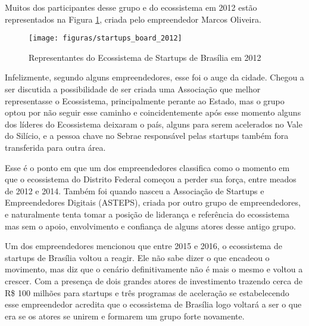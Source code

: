 Muitos dos participantes desse grupo e do ecossistema em 2012 estão representados na Figura \ref{figure:startups_board_2012}, criada pelo empreendedor Marcos Oliveira.

\begin{figure}[!htb]
	\centering
	\texttt{[image: figuras/startups\_board\_2012]}
	\caption{Representantes do Ecossistema de Startups de Brasília em 2012}
	\label{figure:startups_board_2012}
\end{figure}

Infelizmente, segundo alguns empreendedores, esse foi o auge da cidade. Chegou a ser discutida a possibilidade de ser criada uma Associação que melhor representasse o Ecossistema, principalmente perante ao Estado, mas o grupo optou por não seguir esse caminho e coincidentemente após esse momento alguns dos líderes do Ecossistema deixaram o país, alguns para serem acelerados no Vale do Silício, e a pessoa chave no Sebrae responsável pelas startups também fora transferida para outra área. 

Esse é o ponto em que um dos empreendedores classifica como o momento em que o ecossistema do Distrito Federal começou a perder sua força, entre meados de 2012 e 2014. Também foi quando nasceu a Associação de Startups e Empreendedores Digitais (ASTEPS), criada por outro grupo de empreendedores, e naturalmente tenta tomar a posição de liderança e referência do ecossistema mas sem o apoio, envolvimento e confiança de alguns atores desse antigo grupo.

Um dos empreendedores mencionou que entre 2015 e 2016, o ecossistema de startups de Brasília voltou a reagir. Ele não sabe dizer o que encadeou o movimento, mas diz que o cenário definitivamente não é mais o mesmo e voltou a crescer. Com a presença de dois grandes atores de investimento trazendo cerca de R\$ 100 milhões para startups e três programas de aceleração se estabelecendo esse empreendedor acredita que o ecossistema de Brasília logo voltará a ser o que era se os atores se unirem e formarem um grupo forte novamente.